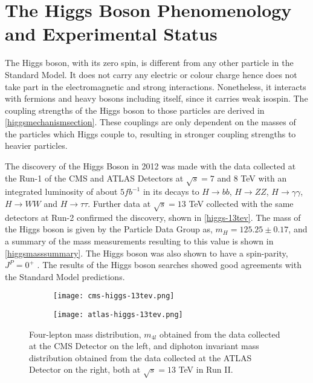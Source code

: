 \section{The Higgs Boson Phenomenology and Experimental Status}\label{higgs-status}

The Higgs boson, with its zero spin, is different from any other particle in the Standard Model. It does not carry any electric or colour charge hence does not take part in the electromagnetic and strong interactions. Nonetheless, it interacts with fermions and heavy bosons including itself, since it carries weak isospin. The coupling strengths of the Higgs boson to those particles are derived in \autoref{higgsmechanismsection}. These couplings are only dependent on the masses of the particles which Higgs couple to, resulting in stronger coupling strengths to heavier particles.

The discovery of the Higgs Boson in 2012 was made with the data collected at the Run-1 of the CMS and ATLAS Detectors at $\sqrt{s} = 7$ and $8$ TeV with an integrated luminosity of about $5 fb^{-1}$ in its decays to $H\rightarrow bb$, $H\rightarrow ZZ$, $H\rightarrow \gamma\gamma$, $H\rightarrow WW$ and $H\rightarrow \tau\tau$. Further data at $\sqrt{s} = 13$ TeV collected with the same detectors at Run-2 confirmed the discovery, shown in \autoref{higgs-13tev}. The mass of the Higgs boson is given by the Particle Data Group\cite{pdg} as, $ m_H = 125.25\pm 0.17$, and a summary of the mass measurements resulting to this value is shown in \autoref{higgsmasssummary}. The Higgs boson was also shown to have a spin-parity, $J^P=0^+$ \cite{higgs-spin}. The results of the Higgs boson searches showed good agreements with the Standard Model predictions.

\begin{figure*}[ht]
        \centering
        \begin{subfigure}[b]{0.475\textwidth}
            \centering
            \texttt{[image: cms-higgs-13tev.png]}
            \vspace{-0.5cm}
        \end{subfigure}
        \hspace{0.2cm}
        \begin{subfigure}[b]{0.475\textwidth}  
            \centering 
            \texttt{[image: atlas-higgs-13tev.png]}
            \vspace{-0.5cm}
        \end{subfigure}
        \caption[Four-lepton mass distribution, $m_{4l}$ obtained from the data collected at the CMS Detector on the left, and diphoton invariant mass distribution obtained from the data collected at the ATLAS Detector on the right, both at $\sqrt{s}=13$ TeV in Run II.]
        {\small Four-lepton mass distribution, $m_{4l}$ obtained from the data collected at the CMS Detector\cite{cms-higgs-13tev} on the left, and diphoton invariant mass distribution obtained from the data collected at the ATLAS Detector\cite{atlas-higgs-13tev} on the right, both at $\sqrt{s}=13$ TeV in Run II.} 
        \label{higgs-13tev}
\end{figure*}

